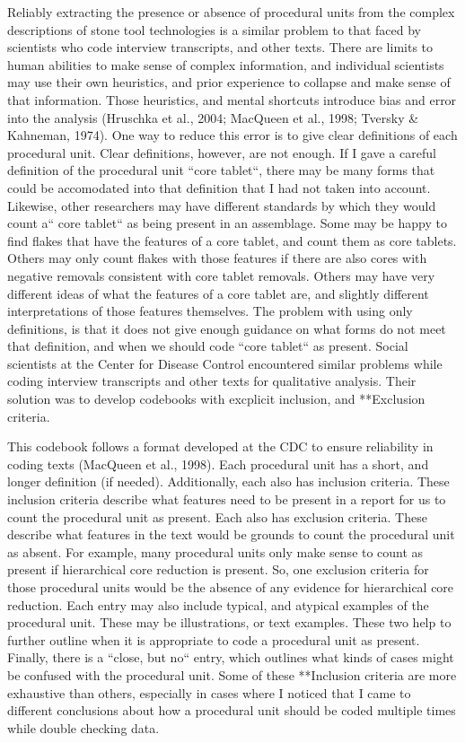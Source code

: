 \documentclass[
]{article}
\begin{document}
Reliably extracting the presence or absence of procedural units from the
complex descriptions of stone tool technologies is a similar problem to
that faced by scientists who code interview transcripts, and other
texts. There are limits to human abilities to make sense of complex
information, and individual scientists may use their own heuristics, and
prior experience to collapse and make sense of that information. Those
heuristics, and mental shortcuts introduce bias and error into the
analysis (Hruschka et al., 2004; MacQueen et al., 1998; Tversky \&
Kahneman, 1974). One way to reduce this error is to give clear
definitions of each procedural unit. Clear definitions, however, are not
enough. If I gave a careful definition of the procedural unit ``core
tablet``, there may be many forms that could be accomodated into that
definition that I had not taken into account. Likewise, other
researchers may have different standards by which they would count a``
core tablet`` as being present in an assemblage. Some may be happy to
find flakes that have the features of a core tablet, and count them as
core tablets. Others may only count flakes with those features if there
are also cores with negative removals consistent with core tablet
removals. Others may have very different ideas of what the features of a
core tablet are, and slightly different interpretations of those
features themselves. The problem with using only definitions, is that it
does not give enough guidance on what forms do not meet that definition,
and when we should code ``core tablet`` as present. Social scientists at
the Center for Disease Control encountered similar problems while coding
interview transcripts and other texts for qualitative analysis. Their
solution was to develop codebooks with excplicit inclusion, and
**Exclusion criteria.

This codebook follows a format developed at the CDC to ensure
reliability in coding texts (MacQueen et al., 1998). Each procedural
unit has a short, and longer definition (if needed). Additionally, each
also has inclusion criteria. These inclusion criteria describe what
features need to be present in a report for us to count the procedural
unit as present. Each also has exclusion criteria. These describe what
features in the text would be grounds to count the procedural unit as
absent. For example, many procedural units only make sense to count as
present if hierarchical core reduction is present. So, one exclusion
criteria for those procedural units would be the absence of any evidence
for hierarchical core reduction. Each entry may also include typical,
and atypical examples of the procedural unit. These may be
illustrations, or text examples. These two help to further outline when
it is appropriate to code a procedural unit as present. Finally, there
is a ``close, but no`` entry, which outlines what kinds of cases might
be confused with the procedural unit. Some of these **Inclusion criteria
are more exhaustive than others, especially in cases where I noticed
that I came to different conclusions about how a procedural unit should
be coded multiple times while double checking data.
\end{document}
